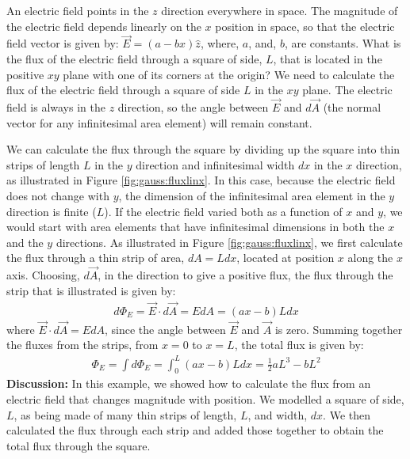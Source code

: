\begin{example}{An electric field points in the $z$ direction everywhere in space. The magnitude of the electric field depends linearly on the $x$ position in space, so that the electric field vector is given by: $\vec E=(a-bx)\hat z$, where, $a$, and, $b$, are constants. What is the flux of the electric field through a square of side, $L$, that is located in the positive $xy$ plane with one of its corners at the origin?}
We need to calculate the flux of the electric field through a square of side $L$ in the $xy$ plane. The electric field is always in the $z$ direction, so the angle between $\vec E$ and $d\vec A$ (the normal vector for any infinitesimal area element) will remain constant.

We can calculate the flux through the square by dividing up the square into thin strips of length $L$ in the $y$ direction and infinitesimal width $dx$ in the $x$ direction, as illustrated in Figure \ref{fig:gauss:fluxlinx}. In this case, because the electric field does not change with $y$, the dimension of the infinitesimal area element in the $y$ direction is finite ($L$). If the electric field varied both as a function of $x$ and $y$, we would start with area elements that have infinitesimal dimensions in both the $x$ and the $y$ directions. 
As illustrated in Figure \ref{fig:gauss:fluxlinx}, we first calculate the flux through a thin strip of area, $dA=Ldx$, located at position $x$ along the $x$ axis. Choosing, $d\vec A$, in the direction to give a positive flux, the flux through the strip that is illustrated is given by:
\begin{align*}
d\Phi_E=\vec E\cdot d\vec A=EdA=(ax-b)Ldx
\end{align*}
where $\vec E\cdot d\vec A=EdA$, since the angle between $\vec E$ and $\vec A$ is zero. Summing together the fluxes from the strips, from $x=0$ to $x=L$, the total flux is given by:
\begin{align*}
\Phi_E=\int d\Phi_E=\int_0^L(ax-b)Ldx=\frac{1}{2}aL^3-bL^2
\end{align*}
\textbf{Discussion:} In this example, we showed how to calculate the flux from an electric field that changes magnitude with position. We modelled a square of side, $L$, as being made of many thin strips of length, $L$, and width, $dx$. We then calculated the flux through each strip and added those together to obtain the total flux through the square.
\end{example}
